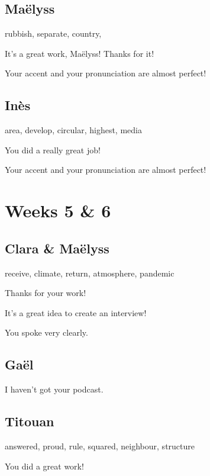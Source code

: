 \documentclass[12pt,oneside]{report}
\begin{document}
\begin{spacing}{1.2}
\subsection*{Maëlyss}

rubbish, separate, country, 

\color{blue}
It's a great work, Maëlyss! Thanks for it!

Your accent and your pronunciation are almost perfect!
\color{black}

\subsection*{Inès}

area, develop, circular, highest, media

\color{blue}
You did a really great job!

Your accent and your pronunciation are almost perfect!
\color{black}






\section{Weeks 5 \& 6}

\subsection*{Clara \& Maëlyss}

receive, climate, return, atmosphere, pandemic

\color{blue}
Thanks for your work!

It's a great idea to create an interview!

You spoke very clearly.
\color{black}

\subsection*{Gaël}

\color{blue}
I haven't got your podcast.
\color{black}

\subsection*{Titouan}

answered, proud, rule, squared, neighbour, structure

\color{blue}
You did a great work!


\end{spacing}
\end{document}
